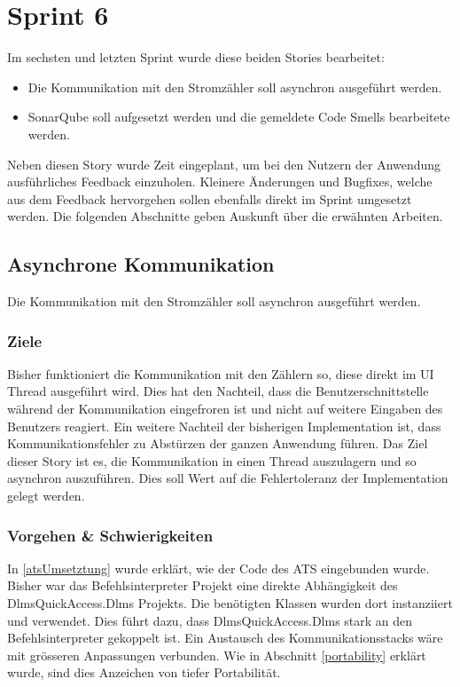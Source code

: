 \section{Sprint 6}
Im sechsten und letzten Sprint wurde diese beiden Stories bearbeitet:
\begin{itemize}
   \item Die Kommunikation mit den Stromzähler soll asynchron ausgeführt werden.
   \item SonarQube soll aufgesetzt werden und die gemeldete Code Smells bearbeitete werden.
\end{itemize}
Neben diesen Story wurde Zeit eingeplant, um bei den Nutzern der Anwendung ausführliches Feedback einzuholen.
Kleinere Änderungen und Bugfixes, welche aus dem Feedback hervorgehen sollen ebenfalls direkt im Sprint umgesetzt werden.
Die folgenden Abschnitte geben Auskunft über die erwähnten Arbeiten.

\subsection{Asynchrone Kommunikation}
\dq Die Kommunikation mit den Stromzähler soll asynchron ausgeführt werden.\dq
\subsubsection{Ziele}
Bisher funktioniert die Kommunikation mit den Zählern so, diese direkt im UI Thread ausgeführt wird.
Dies hat den Nachteil, dass die Benutzerschnittstelle während der Kommunikation eingefroren ist und nicht auf weitere Eingaben des Benutzers reagiert.
Ein weitere Nachteil der bisherigen Implementation ist, dass Kommunikationsfehler zu Abstürzen der ganzen Anwendung führen.
Das Ziel dieser Story ist es, die Kommunikation in einen Thread auszulagern und so asynchron auszuführen.
Dies soll Wert auf die Fehlertoleranz der Implementation gelegt werden.


\subsubsection{Vorgehen \& Schwierigkeiten}
In \ref{atsUmsetztung} wurde erklärt, wie der Code des \ac{ATS} eingebunden wurde.
Bisher war das Befehlsinterpreter Projekt eine direkte Abhängigkeit des DlmsQuickAccess.Dlms Projekts.
Die benötigten Klassen wurden dort instanziiert und verwendet. 
Dies führt dazu, dass DlmsQuickAccess.Dlms stark an den Befehlsinterpreter gekoppelt ist.
Ein Austausch des Kommunikationsstacks wäre mit grösseren Anpassungen verbunden.
Wie in Abschnitt \ref{portability} erklärt wurde, sind dies Anzeichen von tiefer Portabilität.

